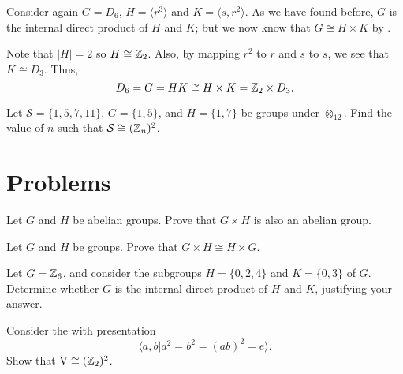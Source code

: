 \begin{example}
    Consider again $G = D_6$, $H = \langle r^3 \rangle$ and $K = \langle s, r^2 \rangle$. As we have found before, $G$ is the internal direct product of $H$ and $K$; but we now know that $G \cong H \times K$ by .

    Note that $|H| = 2$ so $H \cong \mathbb{Z}_2$. Also, by mapping $r^2$ to $r$ and $s$ to $s$, we see that $K \cong D_3$. Thus,
    \[
        D_6 = G = HK \cong H \times K = \mathbb{Z}_2 \times D_3.
    \]
\end{example}

\begin{exercise}
    Let $\mathcal{S} = \{1, 5, 7, 11\}$, $G = \{1, 5\}$, and $H = \{1, 7\}$ be groups under $\otimes_{12}$. Find the value of $n$ such that $\mathcal{S} \cong (\mathbb{Z}_n)^2$.
\end{exercise}

\newpage

\section{Problems}
\begin{problem}\label{problem-external-direct-product-of-abelian-groups-is-abelian}
    Let $G$ and $H$ be abelian groups. Prove that $G \times H$ is also an abelian group.
\end{problem}

\begin{problem}
    Let $G$ and $H$ be groups. Prove that $G \times H \cong H \times G$.
\end{problem}

\begin{problem}
    Let $G = \mathbb{Z}_6$, and consider the subgroups $H = \{0, 2, 4\}$ and $K = \{0, 3\}$ of $G$. Determine whether $G$ is the internal direct product of $H$ and $K$, justifying your answer.
\end{problem}

\begin{problem}
    Consider the  with presentation
    \[
        \langle a, b \vert a^2 = b^2 = (ab)^2 = e \rangle.
    \]
    Show that $\mathrm{V} \cong (\mathbb{Z}_2)^2$.
\end{problem}
